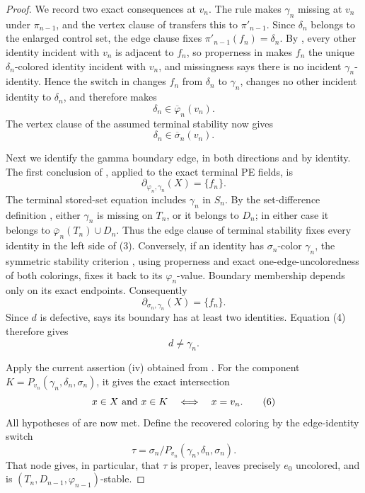 \begin{proof}
We record two exact consequences at \(v_n\). The rule
 makes \(\gamma_n\) missing at \(v_n\)
under \(\pi_{n-1}\), and the vertex clause of
 transfers this to \(\pi'_{n-1}\). Since
\(\delta_n\) belongs to the enlarged control set, the edge clause fixes
\(\pi'_{n-1}(f_n)=\delta_n\). By , every other
identity incident with \(v_n\) is adjacent to \(f_n\), so properness in
 makes \(f_n\) the unique
\(\delta_n\)-colored identity incident with \(v_n\), and missingness says
there is no incident \(\gamma_n\)-identity. Hence the switch in
 changes \(f_n\) from \(\delta_n\) to
\(\gamma_n\), changes no other incident identity to \(\delta_n\), and
therefore makes
\[
                 \delta_n\in\overline\varphi_n(v_n).           \tag{1}
\]
The vertex clause of the assumed terminal stability now gives
\[
                 \delta_n\in\overline\sigma_n(v_n).           \tag{2}
\]

Next we identify the gamma boundary edge, in both directions and by
identity. The first conclusion of
, applied to the exact terminal PE
fields, is
\[
                \partial_{\varphi_n,\gamma_n}(X)=\{f_n\}.      \tag{3}
\]
The terminal stored-set equation includes \(\gamma_n\) in \(S_n\).
By the set-difference definition , either
\(\gamma_n\) is missing on \(T_n\), or it belongs to \(D_n\); in either
case it belongs to
\(\overline\varphi_n(T_n)\cup D_n\). Thus the edge clause of terminal
stability fixes every identity in the left side of (3). Conversely, if
an identity has \(\sigma_n\)-color \(\gamma_n\), the symmetric stability
criterion , using properness and exact
one-edge-uncoloredness of both colorings, fixes it back to its
\(\varphi_n\)-value. Boundary membership depends only on its exact
endpoints. Consequently
\[
                \partial_{\sigma_n,\gamma_n}(X)=\{f_n\}.       \tag{4}
\]
Since \(d\) is defective,  says its boundary has
at least two identities. Equation (4) therefore gives
\[
                              d\ne\gamma_n.                     \tag{5}
\]

Apply the current assertion (iv) obtained from
. For the component
\(K=P_{v_n}(\gamma_n,\delta_n,\sigma_n)\), it gives the exact
intersection
\[
                x\in X\ \hbox{and}\ x\in K
                       \quad\Longleftrightarrow\quad x=v_n.    \tag{6}
\]
All hypotheses of  are now met.
Define the recovered coloring by the edge-identity switch
\[
             \tau=\sigma_n/P_{v_n}(\gamma_n,\delta_n,\sigma_n).
\]
That node gives, in particular, that \(\tau\) is proper, leaves precisely
\(e_0\) uncolored, and is
\((T_n,D_{n-1},\varphi_{n-1})\)-stable.                         


\end{proof}
